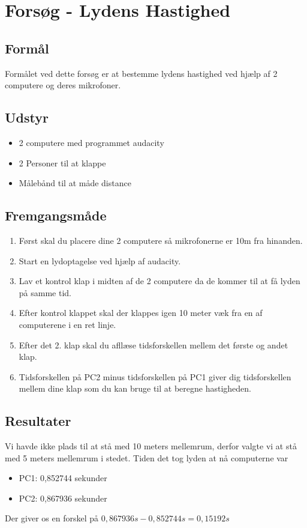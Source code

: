 \section{Forsøg - Lydens Hastighed}
\subsection{Formål}
Formålet ved dette forsøg er at bestemme lydens hastighed ved hjælp af 2 computere og deres mikrofoner.

\subsection{Udstyr}
\begin{itemize}
    \item 2 computere med programmet audacity
    \item 2 Personer til at klappe
    \item Målebånd til at måde distance
\end{itemize}

\subsection{Fremgangsmåde}
\begin{enumerate}
    \item Først skal du placere dine 2 computere så mikrofonerne er 10m fra hinanden.
    \item Start en lydoptagelse ved hjælp af audacity.
    \item Lav et kontrol klap i midten af de 2 computere da de kommer til at få lyden på samme tid.
    \item Efter kontrol klappet skal der klappes igen 10 meter væk fra en af computerene i en ret linje.
    \item Efter det 2. klap skal du afllæse tidsforskellen mellem det første og andet klap.
    \item Tidsforskellen på PC2 minus tidsforskellen på PC1 giver dig tidsforskellen mellem dine klap som du kan bruge til at beregne hastigheden.
\end{enumerate}

\subsection{Resultater}
Vi havde ikke plads til at stå med 10 meters mellemrum, derfor valgte vi at stå med 5 meters mellemrum i stedet.\newline
Tiden det tog lyden at nå computerne var
\begin{itemize}
    \item PC1: 0,852744 sekunder
    \item PC2: 0,867936 sekunder
\end{itemize}
Der giver os en forskel på \begin{math}0,867936s - 0,852744s = 0,15192s\end{math}

